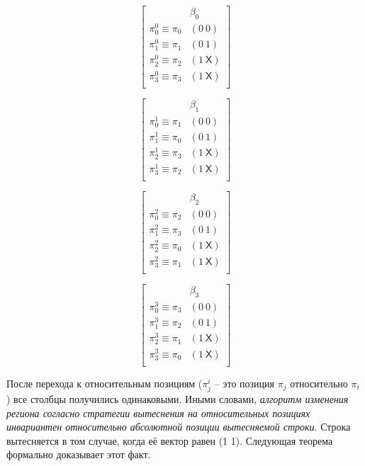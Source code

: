 \parbox{0.24\textwidth}{
$$ \left[
  \begin{array}{c|c}
          & \beta_0 \\ \hline
    \pi^0_0 \equiv \pi_0 & (0~0) \\
    \pi^0_1 \equiv \pi_1 & (0~1) \\
    \pi^0_2 \equiv \pi_2 & (1~\textsf{X}) \\
    \pi^0_3 \equiv \pi_3 & (1~\textsf{X}) \\
  \end{array}
\right]
$$
}\parbox{0.24\textwidth}{
$$ \left[
  \begin{array}{c|c}
          & \beta_1 \\ \hline
    \pi^1_0 \equiv \pi_1 & (0~0) \\
    \pi^1_1 \equiv \pi_0 & (0~1) \\
    \pi^1_2 \equiv \pi_3 & (1~\textsf{X}) \\
    \pi^1_3 \equiv \pi_2 & (1~\textsf{X}) \\
  \end{array}
\right]
$$
}\parbox{0.24\textwidth}{
$$ \left[
  \begin{array}{c|c}
          & \beta_2 \\ \hline
    \pi^2_0 \equiv \pi_2 & (0~0) \\
    \pi^2_1 \equiv \pi_3 & (0~1) \\
    \pi^2_2 \equiv \pi_0 & (1~\textsf{X}) \\
    \pi^2_3 \equiv \pi_1 & (1~\textsf{X}) \\
  \end{array}
\right]
$$
}\parbox{0.24\textwidth}{
$$ \left[
  \begin{array}{c|c}
          & \beta_3 \\ \hline
    \pi^3_0 \equiv \pi_3 & (0~0) \\
    \pi^3_1 \equiv \pi_2 & (0~1) \\
    \pi^3_2 \equiv \pi_1 & (1~\textsf{X}) \\
    \pi^3_3 \equiv \pi_0 & (1~\textsf{X}) \\
  \end{array}
\right]
$$
}

После перехода к относительным позициям ($\pi^i_j$ -- это позиция
$\pi_j$ относительно $\pi_i$) все столбцы получились одинаковыми.
Иными словами, \emph{алгоритм изменения региона согласно стратегии
вытеснения \PseudoLRU на относительных позициях инвариантен
относительно абсолютной позиции вытесняемой строки}. Строка вытесняется в
том случае, когда её вектор равен (1 1). Следующая теорема
формально доказывает этот факт.

